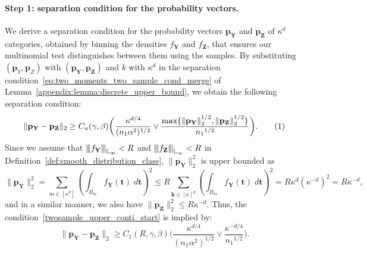 \documentclass[twoside,11pt]{article}
\newcommand\numberthis{\addtocounter{equation}{1}\tag{\theequation}}
\newcommand{\vertiii}[1]{
	{\left\vert\kern-0.25ex\left\vert\kern-0.25ex\left\vert #1 
		\right\vert\kern-0.25ex\right\vert\kern-0.25ex\right\vert}
}%
\newcommand{\rvTwo}{Y}
\newcommand{\rvThree}{Z}
\newcommand{\vectorize}[1]{\mathbf{#1}}
\newcommand{\dimDensity}{d} %
\newcommand{\alphabetSize}{k} %
\newcommand{\vectorIndex}{m}
\newcommand{\sampleSize}{n}
\newcommand{\probVec}{\mathbf{p}} %
\newcommand{\ballRadius}{R}
\newcommand{\privacyParameter}{\alpha} %
\newcommand{\maxErrorTypeTwo}{\beta} %
\newcommand{\maxErrorTypeOne}{\gamma} %
\newcommand{\binNum}{\kappa}           %
\newcommand{\wavFatherUnivIndex}{k}
\newcommand{\wavFatherIndex}{\boldsymbol{\wavFatherUnivIndex}}
\begin{document}
\begin{appendix}
	\paragraph{Step 1: separation condition for the probability vectors.}
	We derive a separation condition for the probability vectors $\probVec_{\vectorize{\rvTwo}}$ and $\probVec_{\vectorize{\rvThree}}$ of $\binNum^\dimDensity$ 
	categories, obtained by binning the densities $f_{\vectorize{\rvTwo}}$ and $f_{\vectorize{\rvThree}}$, that ensures our multinomial test distinguishes between them using the samples. By substituting $(\probVec_{{\rvTwo}}, \probVec_{{\rvThree}})$ with $(\probVec_{\vectorize{\rvTwo}}, \probVec_{\vectorize{\rvThree}})$ 
	and $\alphabetSize$ with $\binNum^\dimDensity$ in the separation condition~\eqref{eq:two_moments_two_sample_cond_merge} of Lemma~\ref{appendix:lemma:discrete_upper_bound}, we obtain the  following separation condition:
	\begin{align*}
		\| \probVec_{\vectorize{\rvTwo}} - \probVec_{\vectorize{\rvThree}} \|_2
		\geq
		C_u( \maxErrorTypeOne, \maxErrorTypeTwo)
		\biggl(
		\frac
		{
			\binNum^{\dimDensity/4}
		}
		{(\sampleSize_1 \privacyParameter^2)^{1/2}} 
		\vee
		\frac
		{ \max\{
			\| \probVec_{\vectorize{\rvTwo}} \|^{1/2}_2, 
			\| \probVec_{\vectorize{\rvThree}} \|^{1/2}_2
			\}}
		{{\sampleSize_1}^{1/2}}
		\biggr).
		\numberthis \label{twosample_upper_conti_start}
	\end{align*}
	Since we assume that 
	$\vertiii{f_{\vectorize{Y}}}_{\mathbb{L}_\infty} < \ballRadius$ and
	$\vertiii{f_{\vectorize{Z}}}_{\mathbb{L}_\infty} < \ballRadius$ in Definition~\ref{def:smooth_distribution_class},
	$\| \probVec_{\vectorize{\rvTwo}} \|_2^2$ is upper bounded as
	\begin{equation*}
		\|
		\probVec_{\vectorize{\rvTwo}}
		\|_2^2
		=
		\sum_{\vectorIndex \in [\binNum^\dimDensity]}
		\left(
		\int_{B_\vectorIndex}
		f_{\vectorize{Y}}(\vectorize{t})\;
		d\vectorize{t}
		\right)^2
		\leq
		\ballRadius
		\sum_{\wavFatherIndex \in [\binNum]^\dimDensity}
		\left(
		\int_{B_\vectorIndex}
		f_{\vectorize{Y}}(\vectorize{t})\;
		d\vectorize{t}
		\right)^2 =
		\ballRadius
		\binNum^\dimDensity
		(\binNum^{-\dimDensity})^2
		=
		\ballRadius
		\binNum^{-\dimDensity},
	\end{equation*}
	and in a similar manner, we also have $\| \probVec_{\vectorize{\rvThree}} \|_2^2 \leq \ballRadius
	\binNum^{-\dimDensity}$.
	Thus, the condition~\eqref{twosample_upper_conti_start} is implied by:
	\begin{equation}\label{twosample_upper_conti_2}
		\| \probVec_{\vectorize{\rvTwo}} - \probVec_{\vectorize{\rvThree}} \|_2
		\geq
		C_1( \ballRadius, \maxErrorTypeOne, \maxErrorTypeTwo)
		\biggl(
		\frac
		{\binNum^{\dimDensity/4}}
		{(\sampleSize_1 \privacyParameter^2)^{1/2}} 
		\vee
		\frac
		{\binNum^{-\dimDensity/4}}
		{{\sampleSize_1}^{1/2}}
		\biggr).
	\end{equation}

\end{appendix}
\end{document}
